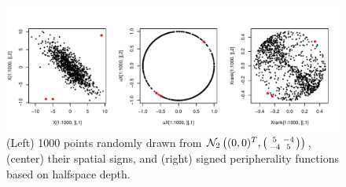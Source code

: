 %
%
% 

\begin{figure}[t]
	\captionsetup{singlelinecheck=off}
	\centering
		\includegraphics[width=\textwidth]{../Codes/signs_and_ranks}
	\caption{(Left) 1000 points randomly drawn from $\mathcal N_2\left((0,0)^T, \left(\protect\begin{smallmatrix} 5 & -4 \\ -4 & 5 \protect\end{smallmatrix}\right)\right) $, (center) their spatial signs, and (right) signed peripherality functions based on halfspace depth.}
	\label{fig:rankplot}
\end{figure}

